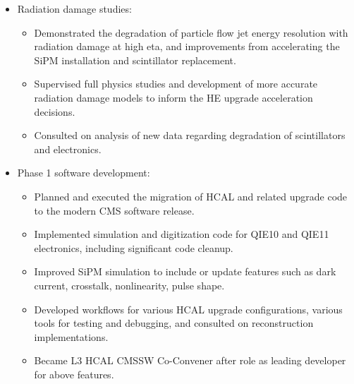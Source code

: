 \begin{itemize}[leftmargin=12pt]
\item Radiation damage studies:
\begin{itemize}
\item Demonstrated the degradation of particle flow jet energy resolution with radiation damage at high eta, and improvements from accelerating the SiPM installation and scintillator replacement.
\item Supervised full physics studies and development of more accurate radiation damage models to inform the HE upgrade acceleration decisions.
\item Consulted on analysis of new data regarding degradation of scintillators and electronics.
\end{itemize}
\item Phase 1 software development:
\begin{itemize}
\item Planned and executed the migration of HCAL and related upgrade code to the modern CMS software release.
\item Implemented simulation and digitization code for QIE10 and QIE11 electronics, including significant code cleanup.
\item Improved SiPM simulation to include or update features such as dark current, crosstalk, nonlinearity, pulse shape.
\item Developed workflows for various HCAL upgrade configurations, various tools for testing and debugging, and consulted on reconstruction implementations.
\item Became L3 HCAL CMSSW Co-Convener after role as leading developer for above features.
\end{itemize}
\end{itemize}
